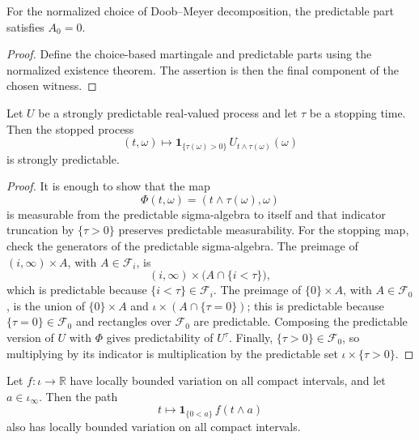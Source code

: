 \begin{lemma}\label{lem:predictablePart_bot_eq_zero}
  \leanok
For the normalized choice of Doob--Meyer decomposition, the predictable
part satisfies \(A_0=0\).
\end{lemma}

\begin{proof}

\leanok
Define the choice-based martingale and predictable parts using the
normalized existence theorem.  The assertion is then the final component
of the chosen witness.
\end{proof}


\begin{lemma}\label{lem:IsStronglyPredictable_stoppedProcess_indicator}
Let \(U\) be a strongly predictable real-valued process and let \(\tau\) be
a stopping time.  Then the stopped process
\[
  (t,\omega)\longmapsto
  \mathbf 1_{\{\tau(\omega)>0\}}\,U_{t\wedge\tau(\omega)}(\omega)
\]
is strongly predictable.
\end{lemma}

\begin{proof}
It is enough to show that the map
\[
  \Phi(t,\omega)=(t\wedge\tau(\omega),\omega)
\]
is measurable from the predictable sigma-algebra to itself and that
indicator truncation by \(\{\tau>0\}\) preserves predictable measurability.
For the stopping map, check the generators of the predictable
sigma-algebra.  The preimage of \((i,\infty)\times A\), with
\(A\in\mathcal F_i\), is
\[
  (i,\infty)\times \bigl(A\cap\{i<\tau\}\bigr),
\]
which is predictable because \(\{i<\tau\}\in\mathcal F_i\).  The preimage of
\(\{0\}\times A\), with \(A\in\mathcal F_0\), is the union of
\(\{0\}\times A\) and \(\iota\times(A\cap\{\tau=0\})\); this is predictable
because \(\{\tau=0\}\in\mathcal F_0\) and rectangles over
\(\mathcal F_0\) are predictable.  Composing the predictable version of
\(U\) with \(\Phi\) gives predictability of \(U^\tau\).  Finally,
\(\{\tau>0\}\in\mathcal F_0\), so multiplying by its indicator is
multiplication by the predictable set \(\iota\times\{\tau>0\}\).
\end{proof}


\begin{lemma}\label{lem:LocallyBoundedVariationOn_stoppedProcess_indicator}
  \leanok
Let \(f:\iota\to\mathbb R\) have locally bounded variation on all compact
intervals, and let \(a\in\iota_\infty\).  Then the path
\[
  t\longmapsto
  \mathbf 1_{\{0<a\}}\,f(t\wedge a)
\]
also has locally bounded variation on all compact intervals.
\end{lemma}

